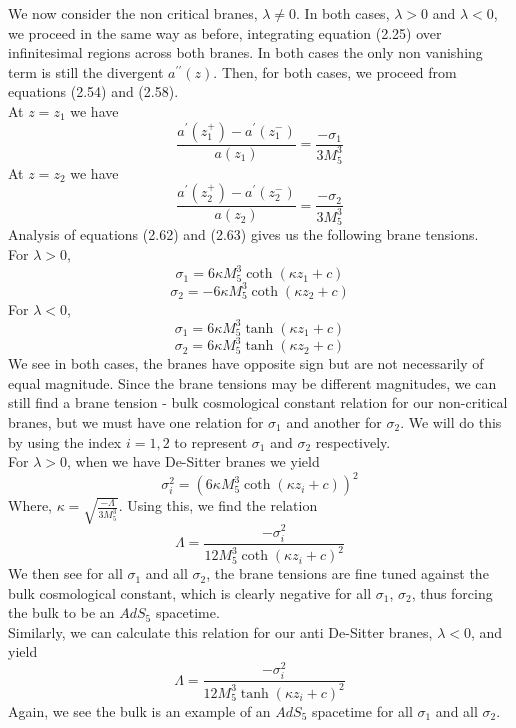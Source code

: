 \documentclass[11pt]{report}
\numberwithin{equation}{chapter}
\begin{document}
We now consider the non critical branes, $\lambda \neq 0$. In both cases, $\lambda > 0$ and $\lambda < 0$, we proceed in the same way as before, integrating equation (2.25) over infinitesimal regions across both branes. In both cases the only non vanishing term is still the divergent $a^{\prime\prime}(z)$. Then, for both cases, we proceed from equations (2.54) and (2.58).\\
At $z=z_1$ we have
\begin{equation}
    \frac{a^\prime\left(z^{+}_1\right)-a^\prime\left(z^{-}_1\right)}{a\left(z_1\right)}=\frac{-\sigma_1}{3M^3_5}
\end{equation}
At $z=z_2$ we have
\begin{equation}
    \frac{a^\prime\left(z^{+}_2\right)-a^\prime\left(z^{-}_2\right)}{a\left(z_2\right)}=\frac{-\sigma_2}{3M^3_5}
\end{equation}
Analysis of equations (2.62) and (2.63) gives us the following brane tensions.\\
For $\lambda > 0$,
\begin{equation}
    \sigma_1 = 6\kappa M^3_5\coth{\left(\kappa z_1 + c\right)}
\end{equation}
\begin{equation}
    \sigma_2 = -6\kappa M^3_5\coth{\left(\kappa z_2 + c\right)}
\end{equation}
For $\lambda < 0$, 
\begin{equation}
    \sigma_1 = 6\kappa M^3_5\tanh{\left(\kappa z_1 +c\right)}
\end{equation}
\begin{equation}
    \sigma_2 = 6\kappa M^3_5\tanh{\left(\kappa z_2 +c\right)}
\end{equation}
We see in both cases, the branes have opposite sign but are not necessarily of equal magnitude. Since the brane tensions may be different magnitudes, we can still find a brane tension - bulk cosmological constant relation for our non-critical branes, but we must have one relation for $\sigma_1$ and another for $\sigma_2$. We will do this by using the index $i={1,2}$ to represent $\sigma_1$ and $\sigma_2$ respectively.\\
For $\lambda > 0$, when we have De-Sitter branes we yield
\begin{equation}
    \sigma_{i}^2 = \left(6\kappa M^3_5\coth{(\kappa z_i +c)}\right)^2 
\end{equation}
Where, $\kappa = \sqrt{\frac{-\Lambda}{3M^3_5}}$. Using this, we find the relation
\begin{equation}
    \Lambda = \frac{-\sigma_i^2}{12M^3_5\coth{(\kappa z_i +c)}^2}
\end{equation}
We then see for all $\sigma_1$ and all $\sigma_2$, the brane tensions are fine tuned against the bulk cosmological constant, which is clearly negative for all $\sigma_1$, $\sigma_2$, thus forcing the bulk to be an $AdS_5$ spacetime.\\
Similarly, we can calculate this relation for our anti De-Sitter branes, $\lambda < 0$, and yield
\begin{equation}
    \Lambda = \frac{-\sigma_i^2}{12M^3_5\tanh{(\kappa z_i +c)}^2}
\end{equation}
Again, we see the bulk is an example of an $AdS_5$ spacetime for all $\sigma_1$ and all $\sigma_2$.
\end{document}

